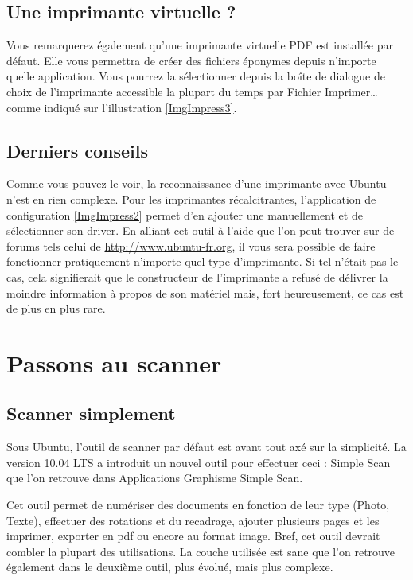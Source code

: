 \subsection{Une imprimante virtuelle ?}
Vous remarquerez également qu'une imprimante virtuelle PDF est installée par défaut. Elle vous permettra de créer des fichiers éponymes depuis n’importe quelle application. Vous pourrez la sélectionner depuis la boîte de dialogue de choix de l'imprimante accessible la plupart du temps par Fichier \FlecheDroite Imprimer\dots{} comme indiqué sur l'illustration \ref{ImgImpress3}.\par
{}
\subsection{Derniers conseils}
Comme vous pouvez le voir, la reconnaissance d'une imprimante avec Ubuntu n'est en rien complexe. Pour les imprimantes récalcitrantes, l'application de configuration \ref{ImgImpress2} permet d'en ajouter une manuellement et de sélectionner son driver. En alliant cet outil à l'aide que l'on peut trouver sur de forums tels celui de \url{http://www.ubuntu-fr.org}, il vous sera possible de faire fonctionner pratiquement n'importe quel type d'imprimante. Si tel n'était pas le cas, cela signifierait que le constructeur de l'imprimante a refusé de délivrer la moindre information à propos de son matériel mais, fort heureusement, ce cas est de plus en plus rare.
\section{Passons au scanner}
\subsection{Scanner simplement}
Sous Ubuntu, l'outil de scanner par défaut est avant tout axé sur la simplicité. La version 10.04 LTS a introduit un nouvel outil pour effectuer ceci : Simple Scan que l'on retrouve dans Applications \FlecheDroite Graphisme \FlecheDroite Simple Scan.\par
Cet outil permet de numériser des documents en fonction de leur type (Photo, Texte), effectuer des rotations et du recadrage, ajouter plusieurs pages et les imprimer, exporter en pdf ou encore au format image. Bref, cet outil devrait combler la plupart des utilisations. La couche utilisée est sane que l'on retrouve également dans le deuxième outil, plus évolué, mais plus complexe.
\newpage
